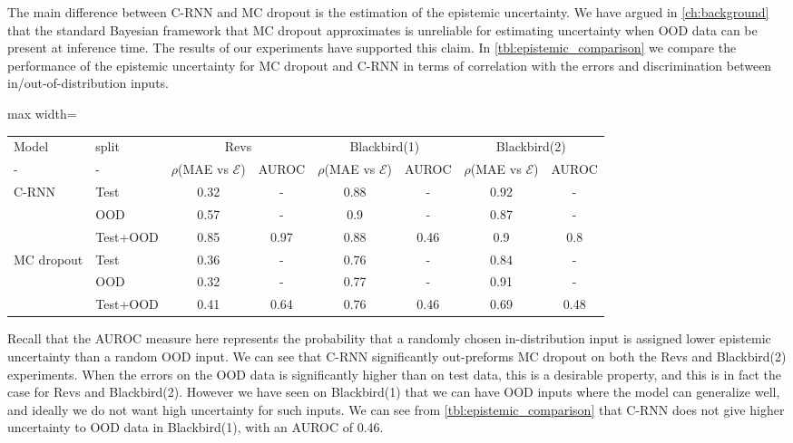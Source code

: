 \documentclass[../main.tex]{subfiles}
\begin{document}
The main difference between C-RNN and MC dropout is the estimation of the epistemic uncertainty. We have argued in \cref{ch:background} that the standard Bayesian framework that MC dropout approximates is unreliable for estimating uncertainty when OOD data can be present at inference time. The results of our experiments have supported this claim. In \cref{tbl:epistemic_comparison} we compare the performance of the epistemic uncertainty for MC dropout and C-RNN in terms of correlation with the errors and discrimination between in/out-of-distribution inputs. 

\begin{table*}[htbp]
\centering
\begin{adjustbox}{max width=\textwidth}
    \begin{tabular}{l l c c c c c c}  
        \toprule
        Model & split & \multicolumn{2}{c}{Revs} & \multicolumn{2}{c}{Blackbird(1)} & \multicolumn{2}{c}{Blackbird(2)}\\
        - & - & $\rho$(MAE vs $\mathcal{E}$) & AUROC &
        $\rho$(MAE vs $\mathcal{E}$) & AUROC & $\rho$(MAE vs $\mathcal{E}$)  & AUROC \\
        \midrule
        \multirow{3}{*}{C-RNN} 
            & Test     & 0.32 & -    & 0.88 & -    & 0.92 & -   \\  
            & OOD      & 0.57 & -    & 0.9  & -    & 0.87 & -   \\  
            & Test+OOD & 0.85 & 0.97 & 0.88 & 0.46 & 0.9  & 0.8 \\ 

        \midrule
        \multirow{3}{*}{MC dropout} 
            & Test     & 0.36 & -    & 0.76  & -    & 0.84 & -  \\  
            & OOD      & 0.32 & -    & 0.77  & -    & 0.91  &  -  \\  
            & Test+OOD & 0.41 & 0.64 & 0.76  & 0.46 & 0.69 & 0.48 \\ 
        
        \toprule
    \end{tabular}
\end{adjustbox}
    \caption[Epistemic uncertainty comparison]{Epistemic uncertainty comparison. We show the Pearson correlation with the MAE, and the AUROC.}
    \label{tbl:epistemic_comparison}
\end{table*}

Recall that the AUROC measure here represents the probability that a randomly chosen in-distribution input is assigned lower epistemic uncertainty than a random OOD input. We can see that C-RNN significantly out-preforms MC dropout on both the Revs and Blackbird(2) experiments. When the errors on the OOD data is significantly higher than on test data, this is a desirable property, and this is in fact the case for Revs and Blackbird(2). However we have seen on Blackbird(1) that we can have OOD inputs where the model can generalize well, and ideally we do not want high uncertainty for such inputs. We can see from \cref{tbl:epistemic_comparison} that C-RNN does not give higher uncertainty to OOD data in Blackbird(1), with an AUROC of 0.46. 
\end{document}
